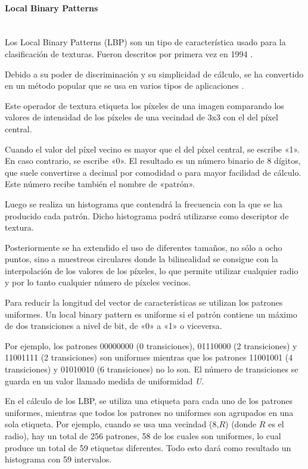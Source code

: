 \paragraph*{Local Binary Patterns}\mbox{} \\
\indent Los Local Binary Patterns (LBP) \cite{wiki:LocalBinaryPatterns} son un tipo de característica usado para la clasificación de texturas. Fueron descritos por primera vez en 1994 \cite{ojala}.

Debido a su poder de discriminación y su simplicidad de cálculo, se ha convertido en un método popular que se usa en varios tipos de aplicaciones \cite{de2011transformaciones}.

Este operador de textura etiqueta los píxeles de una imagen comparando los valores de intensidad de los píxeles de una vecindad de 3x3 con el del píxel central.

Cuando el valor del píxel vecino es mayor que el del píxel central, se escribe «1». En caso contrario, se escribe «0». El resultado es un número binario de 8 dígitos, que suele convertirse a decimal por comodidad o para mayor facilidad de cálculo. Este número recibe también el nombre de «patrón».

Luego se realiza un histograma que contendrá la frecuencia con la que se ha producido cada patrón. Dicho histograma podrá utilizarse como descriptor de textura.

Posteriormente se ha extendido el uso de diferentes tamaños, no sólo a ocho puntos, sino a muestreos circulares donde la bilinealidad se consigue con la interpolación de los valores de los píxeles, lo que permite utilizar cualquier radio y por lo tanto cualquier número de píxeles vecinos.

Para reducir la longitud del vector de características se utilizan los patrones uniformes. Un local binary pattern es uniforme si el patrón contiene un máximo de dos transiciones a nivel de bit, de «0» a «1» o viceversa.


Por ejemplo, los patrones 00000000 (0 transiciones), 01110000 (2 transiciones) y 11001111 (2 transiciones) son uniformes mientras que los patrones 11001001 (4 transiciones) y 01010010 (6 transiciones) no lo son. El número de transiciones se guarda en un valor llamado medida de uniformidad \textit{U}.

En el cálculo de los LBP, se utiliza una etiqueta para cada uno de los patrones uniformes, mientras que todos los patrones no uniformes son agrupados en una sola etiqueta. Por ejemplo, cuando se usa una vecindad (8,$R$) (donde $R$ es el radio), hay un total de 256 patrones, 58 de los cuales son uniformes, lo cual produce un total de 59 etiquetas diferentes. Todo esto dará como resultado un histograma con 59 intervalos.
\newpage

